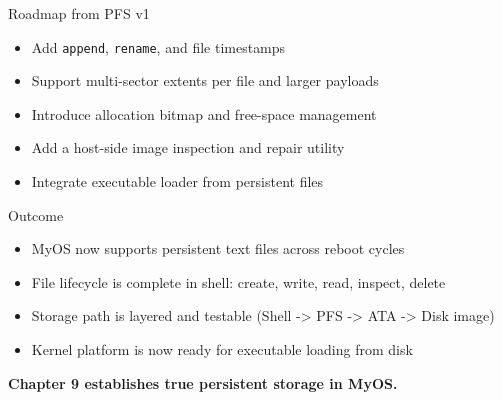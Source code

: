 \documentclass[aspectratio=169]{beamer}
\begin{document}
\begin{frame}{Roadmap from PFS v1}
  \begin{itemize}
    \item Add \texttt{append}, \texttt{rename}, and file timestamps
    \item Support multi-sector extents per file and larger payloads
    \item Introduce allocation bitmap and free-space management
    \item Add a host-side image inspection and repair utility
    \item Integrate executable loader from persistent files
  \end{itemize}
\end{frame}

\begin{frame}{Outcome}
  \begin{itemize}
    \item MyOS now supports persistent text files across reboot cycles
    \item File lifecycle is complete in shell: create, write, read, inspect, delete
    \item Storage path is layered and testable (Shell -> PFS -> ATA -> Disk image)
    \item Kernel platform is now ready for executable loading from disk
  \end{itemize}
  \vspace{8pt}
  \begin{center}
    \Large \textbf{Chapter 9 establishes true persistent storage in MyOS.}
  \end{center}
\end{frame}
\end{document}
